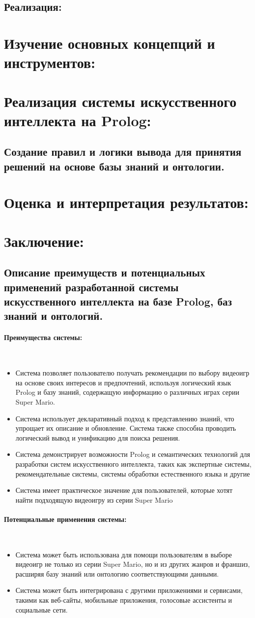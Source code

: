 \documentclass[12pt,onecolumn]{article}
\newcommand{\nparagraph}[1]{\paragraph{#1}\mbox{}\\}
\begin{document}
\subsection{Реализация:}

\section{Изучение основных концепций и инструментов:}
\section{Реализация системы искусственного интеллекта на Prolog:}
\subsection{Создание правил и логики вывода для принятия решений на основе базы знаний и онтологии.}

\section{Оценка и интерпретация результатов:}

\section{Заключение:}
\subsection{Описание преимуществ и потенциальных применений разработанной системы искусственного интеллекта на базе Prolog, баз знаний и онтологий.}
\nparagraph{Преимущества системы:}
\begin{itemize}
  \item Система позволяет пользователю получать рекомендации по выбору видеоигр на основе своих интересов и предпочтений, используя логический язык Prolog и базу знаний, содержащую информацию о различных играх серии Super Mario.
  \item Система использует декларативный подход к представлению знаний, что упрощает их описание и обновление. Система также способна проводить логический вывод и унификацию для поиска решения.
  \item Система демонстрирует возможности Prolog и семантических технологий для разработки систем искусственного интеллекта, таких как экспертные системы, рекомендательные системы, системы обработки естественного языка и другие
  \item Система имеет практическое значение для пользователей, которые хотят найти подходящую видеоигру из серии Super Mario
\end{itemize}
\nparagraph{Потенциальные применения системы:}
\begin{itemize}
  \item Система может быть использована для помощи пользователям в выборе видеоигр не только из серии Super Mario, но и из других жанров и франшиз, расширяя базу знаний или онтологию соответствующими данными.
  \item Система может быть интегрирована с другими приложениями и сервисами, такими как веб-сайты, мобильные приложения, голосовые ассистенты и социальные сети.
\end{itemize}
\end{document}
